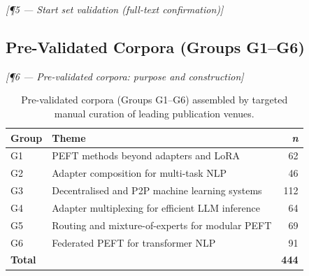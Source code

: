 \bigskip\noindent\textit{[¶5 — Start set validation (full-text confirmation)]}


\subsection{Pre-Validated Corpora (Groups G1--G6)}
\label{sec:methodology:prevalidated}



\bigskip\noindent\textit{[¶6 — Pre-validated corpora: purpose and construction]}

\begin{table}[htbp]
  \centering
  \caption{Pre-validated corpora (Groups G1--G6) assembled by targeted
           manual curation of leading publication venues.}
  \label{tab:prevalidated}
  \begin{tabular}{llr}
    \toprule
    \textbf{Group} & \textbf{Theme} & \textbf{\textit{n}} \\
    \midrule
    G1 & PEFT methods beyond adapters and LoRA                   &  62 \\
    G2 & Adapter composition for multi-task NLP                  &  46 \\
    G3 & Decentralised and P2P machine learning systems          & 112 \\
    G4 & Adapter multiplexing for efficient LLM inference        &  64 \\
    G5 & Routing and mixture-of-experts for modular PEFT         &  69 \\
    G6 & Federated PEFT for transformer NLP                      &  91 \\
    \midrule
    \textbf{Total} & & \textbf{444} \\
    \bottomrule
  \end{tabular}
\end{table}


